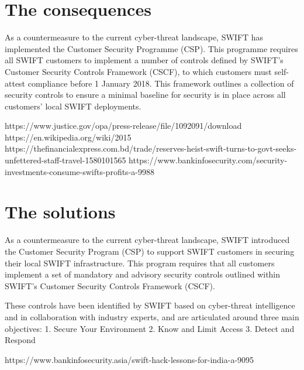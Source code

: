\documentclass[12pt]{article}
\begin{document}
\section{The consequences}
        
        As a countermeasure to the current cyber-threat landscape, SWIFT has implemented the Customer Security Programme (CSP). This programme requires all SWIFT customers to implement a number of controls defined by SWIFT’s Customer Security Controls Framework (CSCF), to which customers must self-attest compliance before 1 January 2018. This framework outlines a collection of security controls to ensure a minimal baseline for security is in place across all customers’ local SWIFT deployments.
        
        https://www.justice.gov/opa/press-release/file/1092091/download
        https://en.wikipedia.org/wiki/2015%
        https://thefinancialexpress.com.bd/trade/reserves-heist-swift-turns-to-govt-seeks-unfettered-staff-travel-1580101565
        https://www.bankinfosecurity.com/security-investments-consume-swifts-profits-a-9988
        
\section{The solutions}
        
        As a countermeasure to the current cyber-threat landscape, SWIFT introduced the Customer Security Program (CSP) to support SWIFT customers in securing their local SWIFT infrastructure. This program requires that all customers implement a set of mandatory and advisory security controls outlined within SWIFT’s Customer Security Controls Framework (CSCF).
        
        These controls have been identified by SWIFT based on cyber-threat intelligence and in collaboration with industry experts, and are articulated around three main objectives:
        1. Secure Your Environment 
        2. Know and Limit Access 
        3. Detect and Respond
        
        https://www.bankinfosecurity.asia/swift-hack-lessons-for-india-a-9095
        

\begin{flushright}
 \end{flushright}
\newpage
\printbibliography[heading=bibintoc]
\end{document}
